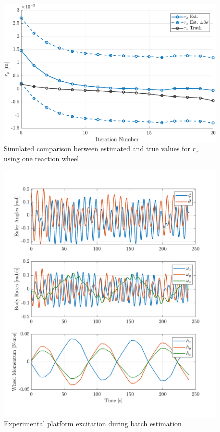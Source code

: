 \begin{figure}[p]
    \centering
    \includegraphics[width=\linewidth]{plots/LSR_sim_confidence_1_wheel.pdf}
    \caption{Simulated comparison between estimated and true values for $r_x$ using one reaction wheel}
    \label{fig:LSR_sim_confidence_1_wheel}
\end{figure}

\begin{figure}[p]
    \centering
    \includegraphics[width=\linewidth]{plots/LSR_hardware_excitation.png}
    \caption{Experimental platform excitation during batch estimation}
    \label{fig:LSR_hardware_excitation}
\end{figure}


